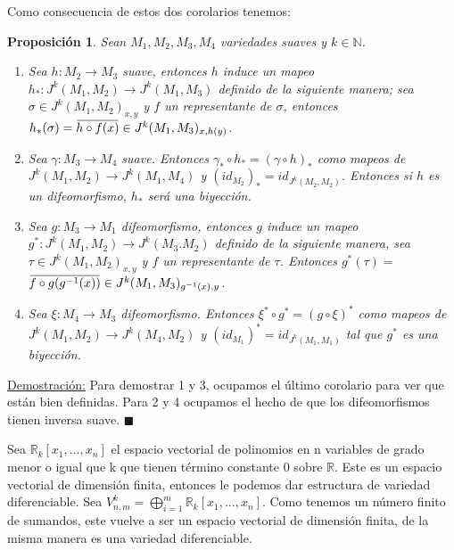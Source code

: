 \documentclass{report}
\newtheorem{prop}[theorem]{Proposici\'on}
\theoremstyle{definition}
\newcommand{\overbar}[1]{\mkern 1.5mu\overline{\mkern-1.5mu#1\mkern-1.5mu}\mkern 1.5mu}
\begin{document}
Como consecuencia de estos dos corolarios tenemos:
\begin{prop}
Sean $M_1 , M_2 , M_3 , M_4 $ variedades suaves y $k \in \mathbb{N}$.
\begin{enumerate}
\item Sea $h: M_2 \to M_3$ suave, entonces $h$ induce un mapeo $h_\ast: J^k (M_1,M_2) \to J^k (M_1, M_3)$ definido de la siguiente manera; sea $\sigma \in J^k (M_1, M_2 )_{x , y}$ y $f$ un representante de $\sigma$, entonces $h_\ast (\sigma) = \overbar{ h \circ f (x)} \in J^k (M_1, M_3)_{x , h(y)}$.

\item Sea $\gamma: M_3 \to M_4$ suave. Entonces $\gamma_\ast \circ h_\ast = ( \gamma \circ h )_\ast$ como mapeos de $J^k (M_1 , M_2) \to J^k (M_1 , M_4)$ y $(id_{M_2})_\ast = id_{J^k (M_2, M_2)}$. Entonces si $h$ es un difeomorfismo, $h_\ast$ ser\'a una biyecci\'on.

\item Sea $g: M_3 \to M_1$ difeomorfismo, entonces $g$ induce un mapeo $g^\ast : J^k (M_1, M_2) \to J^k (M_3. M_2)$ definido de la siguiente manera, sea\\ $\tau \in J^k (M_1, M_2)_{x , y}$ y $f$ un representante de $\tau$. Entonces $g^\ast ( \tau ) = $\\$\overbar{f \circ g ( g^{-1} (x))} \in J^k ( M_1,M_3)_{g^{-1} (x) , y}$.

\item Sea $\xi: M_4 \to M_3$ difeomorfismo. Entonces $\xi^\ast \circ g^\ast = ( g \circ \xi )^\ast $ como mapeos de $J^k( M_1 , M_2) \to J^k (M_4, M_2)$ y $(id_{M_1})^\ast = id_{J^k( M_1 ,M_1)}$ tal que $g^\ast$ es una biyecci\'on.
\end{enumerate}
\end{prop}

\underline{Demostraci\'on:}
Para demostrar 1 y 3, ocupamos el \'ultimo corolario para ver que est\'an bien definidas. Para 2 y 4 ocupamos el hecho de que los difeomorfismos tienen inversa suave. $\blacksquare$

Sea $\mathbb{R}_k [x_1, \dots, x_n]$ el espacio vectorial de polinomios en n variables de grado menor o igual que k que tienen t\'ermino constante $0$ sobre $\mathbb{R}$. Este es un espacio vectorial de dimensi\'on finita, entonces le podemos dar estructura de variedad diferenciable. Sea $V_{n,m}^k = \bigoplus\limits_{i=1}^m \mathbb{R}_k [x_1, \dots, x_n]$. Como tenemos un n\'umero finito de sumandos, este vuelve a ser un espacio vectorial de dimensi\'on finita, de la misma manera es una variedad diferenciable. 
\end{document}
